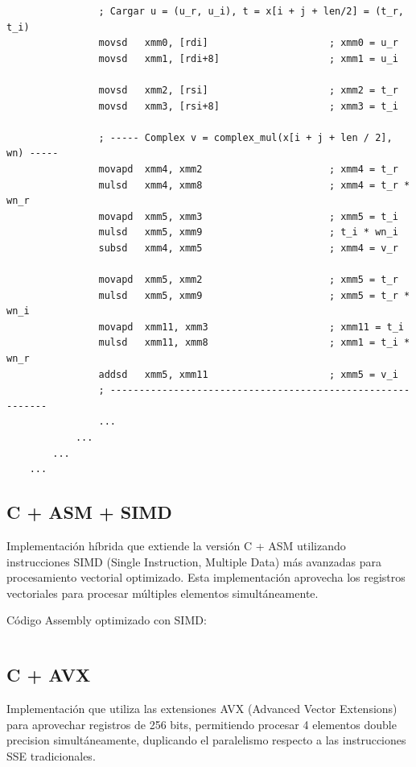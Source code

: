 \documentclass[a4paper]{article}
\begin{document}
\begin{verbatim}
                ; Cargar u = (u_r, u_i), t = x[i + j + len/2] = (t_r, t_i)
                movsd   xmm0, [rdi]                     ; xmm0 = u_r
                movsd   xmm1, [rdi+8]                   ; xmm1 = u_i

                movsd   xmm2, [rsi]                     ; xmm2 = t_r
                movsd   xmm3, [rsi+8]                   ; xmm3 = t_i

                ; ----- Complex v = complex_mul(x[i + j + len / 2], wn) -----
                movapd  xmm4, xmm2                      ; xmm4 = t_r
                mulsd   xmm4, xmm8                      ; xmm4 = t_r * wn_r
                movapd  xmm5, xmm3                      ; xmm5 = t_i
                mulsd   xmm5, xmm9                      ; t_i * wn_i
                subsd   xmm4, xmm5                      ; xmm4 = v_r

                movapd  xmm5, xmm2                      ; xmm5 = t_r
                mulsd   xmm5, xmm9                      ; xmm5 = t_r * wn_i
                movapd  xmm11, xmm3                     ; xmm11 = t_i
                mulsd   xmm11, xmm8                     ; xmm1 = t_i * wn_r
                addsd   xmm5, xmm11                     ; xmm5 = v_i
                ; -----------------------------------------------------------
                ...
            ...
        ...
    ...
\end{verbatim}

\subsection{C + ASM + SIMD}

Implementación híbrida que extiende la versión C + ASM utilizando instrucciones SIMD (Single Instruction, Multiple Data) más avanzadas para procesamiento vectorial optimizado.
Esta implementación aprovecha los registros vectoriales para procesar múltiples elementos simultáneamente.

Código Assembly optimizado con SIMD:
\begin{verbatim}
\end{verbatim}

\subsection{C + AVX}
Implementación que utiliza las extensiones AVX (Advanced Vector Extensions) para aprovechar registros de 256 bits, permitiendo procesar 4 elementos double precision simultáneamente,
duplicando el paralelismo respecto a las instrucciones SSE tradicionales.
\end{document}
